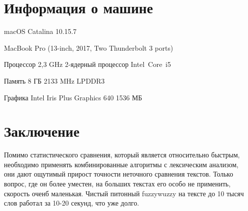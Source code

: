 \section{Информация о машине}

macOS Catalina 10.15.7

MacBook Pro (13-inch, 2017, Two Thunderbolt 3 ports)

Процессор 2,3 GHz 2‑ядерный процессор Intel Core i5

Память 8 ГБ 2133 MHz LPDDR3

Графика Intel Iris Plus Graphics 640 1536 МБ

\section{Заключение}

Помимо статистического сравнения, который является относительно быстрым, необходимо применять комбинированные алгоритмы с лексическим анализом, они дают ощутимый прирост точности неточного сравнения текстов. Только вопрос, где он более уместен, на больших текстах его особо не применить, скорость оченб маленькая. Чистый питонный fuzzywuzzy на тексте до 10 тысяч слов работал за 10-20 секунд, что уже долго.










